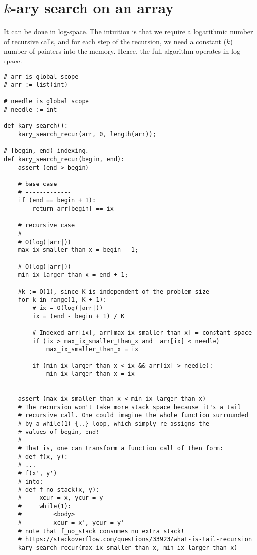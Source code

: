 \documentclass{article}
\begin{document}
\section{$k$-ary search on an array}

It can be done in log-space. The intuition is that we require a logarithmic
number of recursive calls, and for each step of the recursion, we need 
a constant ($k$) number of pointers into the memory. Hence, the full
algorithm operates in log-space.

\begin{verbatim}
# arr is global scope
# arr := list(int)

# needle is global scope
# needle := int

def kary_search():
    kary_search_recur(arr, 0, length(arr));

# [begin, end) indexing.
def kary_search_recur(begin, end):
    assert (end > begin)

    # base case
    # -------------
    if (end == begin + 1):
        return arr[begin] == ix

    # recursive case
    # -------------
    # O(log(|arr|))
    max_ix_smaller_than_x = begin - 1;

    # O(log(|arr|))
    min_ix_larger_than_x = end + 1;

    #k := O(1), since K is independent of the problem size
    for k in range(1, K + 1):
        # ix = O(log(|arr|))
        ix = (end - begin + 1) / K

        # Indexed arr[ix], arr[max_ix_smaller_than_x] = constant space
        if (ix > max_ix_smaller_than_x and  arr[ix] < needle)
            max_ix_smaller_than_x = ix

        if (min_ix_larger_than_x < ix && arr[ix] > needle):
            min_ix_larger_than_x = ix


    assert (max_ix_smaller_than_x < min_ix_larger_than_x)
    # The recursion won't take more stack space because it's a tail
    # recursive call. One could imagine the whole function surrounded
    # by a while(1) {..} loop, which simply re-assigns the
    # values of begin, end!
    # 
    # That is, one can transform a function call of then form:
    # def f(x, y):
    # ...
    # f(x', y')
    # into:
    # def f_no_stack(x, y):
    #     xcur = x, ycur = y
    #     while(1):
    #         <body>
    #         xcur = x', ycur = y'
    # note that f_no_stack consumes no extra stack!
    # https://stackoverflow.com/questions/33923/what-is-tail-recursion
    kary_search_recur(max_ix_smaller_than_x, min_ix_larger_than_x)
\end{verbatim}
\end{document}

